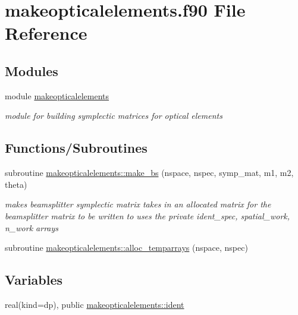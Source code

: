 \hypertarget{makeopticalelements_8f90}{}\section{makeopticalelements.\+f90 File Reference}
\label{makeopticalelements_8f90}
\subsection*{Modules}
\begin{DoxyCompactItemize}
\item 
module \hyperlink{namespacemakeopticalelements}{makeopticalelements}
\begin{DoxyCompactList}\small\item\em module for building symplectic matrices for optical elements \end{DoxyCompactList}\end{DoxyCompactItemize}
\subsection*{Functions/\+Subroutines}
\begin{DoxyCompactItemize}
\item 
subroutine \hyperlink{namespacemakeopticalelements_a593a6ee34afdeebc8b4667791c8a144f}{makeopticalelements\+::make\+\_\+bs} (nspace, nspec, symp\+\_\+mat, m1, m2, theta)
\begin{DoxyCompactList}\small\item\em makes beamsplitter symplectic matrix  takes in an allocated matrix for the beamsplitter matrix to be written to uses the private ident\+\_\+spec, spatial\+\_\+work, n\+\_\+work arrays \end{DoxyCompactList}\item 
subroutine \hyperlink{namespacemakeopticalelements_aefda61530c80eccf75e7065015af413d}{makeopticalelements\+::alloc\+\_\+temparrays} (nspace, nspec)
\end{DoxyCompactItemize}
\subsection*{Variables}
\begin{DoxyCompactItemize}
\item 
real(kind=dp), public \hyperlink{namespacemakeopticalelements_ab4e48a98a0fb0756bb4eff6ece9623a8}{makeopticalelements\+::ident}
\end{DoxyCompactItemize}
